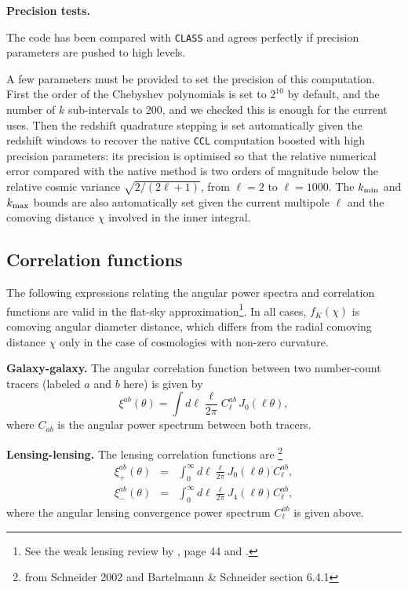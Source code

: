 \documentclass[\docopts]{\docclass}
\newcommand{\ccl}{{\tt CCL}\xspace}
\begin{document}
{\bf Precision tests.}

The code has been compared with \texttt{CLASS} and agrees perfectly if
precision parameters are pushed to high levels.

A few parameters must be provided to set the precision of this computation.
First the order of the Chebyshev polynomials is set to $2^{10}$ by default,
and the number of $k$ sub-intervals to 200, and we checked this is enough for
the current uses. Then the redshift quadrature stepping is set automatically
given the redshift windows to recover the native \ccl computation boosted with
high precision parameters: its precision is optimised so that the relative
numerical error compared with the native method is two orders of magnitude
below the relative cosmic variance $\sqrt{2/(2\ell+1)}$, from $\ell=2$ to
$\ell=1000$. The $k_{\rm min}$ and $k_{\rm max}$ bounds are also automatically
set given the current multipole $\ell$ and the comoving distance $\chi$
involved in the inner integral.


%
%

\subsection{Correlation functions}
\label{sec:corr}


The following expressions relating the angular power spectra and correlation
functions are valid in the flat-sky approximation\footnote{See the weak lensing
review by \citet{Bartelmann01}, page 44 and \citet{Joachimi10}.}. In all cases,
$f_K(\chi)$ is comoving angular diameter distance, which differs from the radial
comoving distance $\chi$ only in the case of cosmologies with non-zero curvature.

{\bf Galaxy-galaxy.} The angular correlation function between two number-count
tracers (labeled $a$ and $b$ here) is given by
\begin{equation}
  \xi^{ab}(\theta) = \int d\ell \frac{\ell}{2\pi} C^{ab}_\ell\, J_0(\ell\theta),
\label{eq:xiclu}
\end{equation}
where $C_{ab}$ is the angular power spectrum between both tracers.

{\bf Lensing-lensing.} The lensing correlation functions are \footnote{from Schneider 2002 and Bartelmann \& Schneider section 6.4.1}
\begin{eqnarray}
  \xi^{ab}_{+}(\theta)&=&\int_0^{\infty}d\ell\frac{\ell}{2\pi}J_0(\ell\theta)C^{ab}_\ell,\\
  \xi^{ab}_{-}(\theta)&=&\int_0^{\infty}d\ell\frac{\ell}{2\pi}J_4(\ell\theta)C^{ab}_\ell,
\label{eq:xipxim}
\end{eqnarray}
where the angular lensing convergence power spectrum $C^{ab}_\ell$ is given above.
\end{document}
